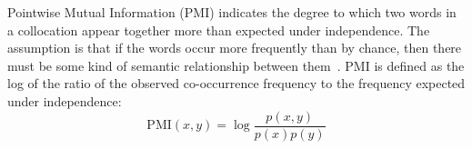 

\begin{definition} 
Pointwise Mutual Information (PMI) indicates the degree to which two words in a collocation appear 
together more than expected under independence. The assumption is that if the words occur more 
frequently than by chance, then there must be some kind of semantic relationship between 
them~\citep{Role2011}. PMI is defined as the log of the ratio of the observed co-occurrence frequency 
to the frequency expected under independence: 
\[\text{PMI}(x,y) = \log \frac{ p(x,y) }{p(x) p(y)}\]
\end{definition}

